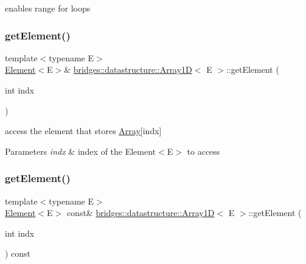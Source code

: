 enables range for loops 

\mbox{\label{classbridges_1_1datastructure_1_1_array1_d_a48fbe4ee71c52303033effcd4e1369c0}} 
\subsubsection{\texorpdfstring{get\+Element()}{getElement()}\hspace{0.1cm}{\footnotesize\ttfamily [1/2]}}
{\footnotesize\ttfamily template$<$typename E$>$ \\
\mbox{\hyperlink{classbridges_1_1datastructure_1_1_element}{Element}}$<$E$>$\& \mbox{\hyperlink{classbridges_1_1datastructure_1_1_array1_d}{bridges\+::datastructure\+::\+Array1D}}$<$ E $>$\+::get\+Element (\begin{DoxyParamCaption}\item[{int}]{indx }\end{DoxyParamCaption})\hspace{0.3cm}{\ttfamily [inline]}}



access the element that stores \mbox{\hyperlink{classbridges_1_1datastructure_1_1_array}{Array}}\mbox{[}indx\mbox{]} 


\begin{DoxyParams}{Parameters}
{\em indx} & index of the Element$<$\+E$>$ to access \\
\hline
\end{DoxyParams}
\mbox{\label{classbridges_1_1datastructure_1_1_array1_d_a92398a260b9d2a09d6f1f536a36a0988}} 
\subsubsection{\texorpdfstring{get\+Element()}{getElement()}\hspace{0.1cm}{\footnotesize\ttfamily [2/2]}}
{\footnotesize\ttfamily template$<$typename E$>$ \\
\mbox{\hyperlink{classbridges_1_1datastructure_1_1_element}{Element}}$<$E$>$ const\& \mbox{\hyperlink{classbridges_1_1datastructure_1_1_array1_d}{bridges\+::datastructure\+::\+Array1D}}$<$ E $>$\+::get\+Element (\begin{DoxyParamCaption}\item[{int}]{indx }\end{DoxyParamCaption}) const\hspace{0.3cm}{\ttfamily [inline]}}



